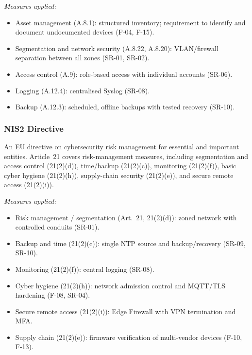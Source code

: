 \documentclass[11pt,a4paper]{article}
\begin{document}
\textit{Measures applied:}
\begin{itemize}[nosep]
  \item Asset management (A.8.1): structured inventory; requirement to identify
      and document undocumented devices (F-04, F-15).

  \item Segmentation and network security (A.8.22, A.8.20): VLAN/firewall
      separation between all zones (SR-01, SR-02).

  \item Access control (A.9): role-based access with individual accounts
      (SR-06).

  \item Logging (A.12.4): centralised Syslog (SR-08).

  \item Backup (A.12.3): scheduled, offline backups with tested recovery
      (SR-10).
\end{itemize}

\subsubsection{NIS2 Directive}
An EU directive on cybersecurity risk management for essential and important
entities. Article~21 covers risk-management measures, including segmentation
and access control (21(2)(d)), time/backup (21(2)(c)), monitoring (21(2)(f)),
basic cyber hygiene (21(2)(h)), supply-chain security (21(2)(e)), and secure
remote access (21(2)(i)).

\textit{Measures applied:}
\begin{itemize}[nosep]
  \item Risk management / segmentation (Art.~21, 21(2)(d)): zoned network with
      controlled conduits (SR-01).

  \item Backup and time (21(2)(c)): single NTP source and backup/recovery
      (SR-09, SR-10).

  \item Monitoring (21(2)(f)): central logging (SR-08).

  \item Cyber hygiene (21(2)(h)): network admission control and MQTT/TLS
      hardening (F-08, SR-04).

  \item Secure remote access (21(2)(i)): Edge Firewall with VPN termination and
      MFA.

  \item Supply chain (21(2)(e)): firmware verification of multi-vendor devices
      (F-10, F-13).
\end{itemize}
\end{document}
